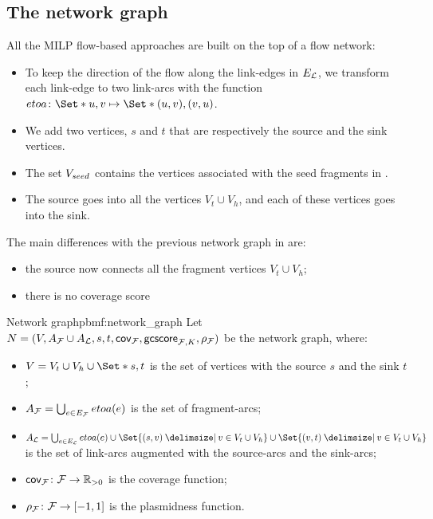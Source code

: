 \subsection{The network graph}\label{sec:pbmf:network}

All the MILP flow-based approaches are built on the top of a flow network:

\begin{itemize}
  \item To keep the direction of the flow along the link-edges in \(E_{\mathcal{L}}{}\), we transform each link-edge to two link-arcs with the function \(etoa \colon \Set*{u, v} \mapsto \Set*{(u, v), (v, u)}\).
  \item We add two vertices, \(s\) and \(t\) that are respectively the source and the sink vertices.
  \item The set \(V_{seed}{}\) contains the vertices associated with the seed fragments in \SeedFrags{}.
  \item The source goes into all the vertices \(V_t \cup V_h\), and each of these vertices goes into the sink.
\end{itemize}

The main differences with the previous network graph in  are:
\begin{itemize}
  \item the source now connects all the fragment vertices \(V_t \cup V_h\);
  \item there is no coverage score
\end{itemize}

\begin{definition}{Network graph}{pbmf:network_graph}
  Let \(N = (V, A_{\mathcal{F}}{} \cup A_{\mathcal{L}}{}, s, t, \mathsf{cov}_{\mathcal{F}{}}, \mathsf{gcscore}_{\mathcal{F}{}, K}, \rho_{\mathcal{F}{}})\) be the network graph, where:

  \begin{itemize}
    \item \( V = V_t \cup V_h \cup \Set*{s, t} \) is the set of vertices with the source \(s\) and the sink \(t\);
    \item \( A_{\mathcal{F}}{} = \bigcup_{e \in E_{\mathcal{F}}{}} etoa(e) \) is the set of fragment-arcs;
    \item \( A_\Links{} = \bigcup_{e \in E_\Links{}} etoa(e) \cup \Set{(s, v) \given v \in V_t \cup V_h} \cup \Set{(v, t) \given v \in V_t \cup V_h} \) is the set of link-arcs augmented with the source-arcs and the sink-arcs;
    \item \( \mathsf{cov}_{\mathcal{F}{}} \colon \mathcal{F}{} \to \mathbb{R}{}_{> 0} \) is the coverage function;
    \item \( \rho_{\mathcal{F}{}} \colon \mathcal{F}{} \to [-1, 1] \) is the plasmidness function.
  \end{itemize}
\end{definition}
